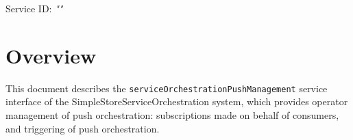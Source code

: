 \documentclass[a4paper]{arrowhead}
\begin{document}
\sloppy

\ArrowheadSetup

\begin{center}
  \vspace*{1cm}
  \huge{\arrowtitle}

  \vspace*{0.2cm}
  \LARGE{\arrowtype}
  \vspace*{1cm}

  \Large{Service ID: \textit{"\arrowid"}}

  \vspace*{\fill}


  \vspace*{1cm}
  \vspace*{\fill}

  \begin{abstract}
    This document describes the HTTP/1.1 protocol with TLS payload security and JSON payload encoding variant of the \texttt{service\allowbreak{}Orchestration\allowbreak{}Push\allowbreak{}Management} service of the SimpleStoreServiceOrchestration system.
  \end{abstract}

  \vspace*{1cm}
\end{center}

\newpage

\tableofcontents
\newpage

\section{Overview}
\label{sec:overview}

This document describes the \texttt{service\allowbreak{}Orchestration\allowbreak{}Push\allowbreak{}Management} service interface of the SimpleStoreServiceOrchestration system, which provides operator management of push orchestration: subscriptions made on behalf of consumers, and triggering of push orchestration.
\end{document}
